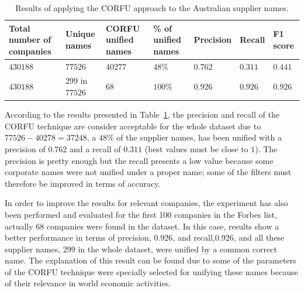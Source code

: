 \documentclass[1p,12pt]{elsarticle}
\begin{document}
\begin{table}[!h]
	\renewcommand{\arraystretch}{1.3}
	\begin{center}
		\begin{tabular}{|p{2.5cm}|p{2cm}|p{1.5cm}|p{1.8cm}|l|l|l|}
			\hline
			\textbf{Total number of companies} & \textbf{Unique names}& \textbf{CORFU unified names}& \textbf{\% of unified names} & \textbf{Precision} & \textbf{Recall} & \textbf{F1 score} \\  \hline
			$430188$ & $77526$ & $40277$  &$48\%$ & $0.762$ & $0.311$&$0.441$ \\ \hline   
			$430188$ & $299$ in $77526$ & $68$ & $100\%$&  $0.926$ & $0.926$ &$0.926$\\ \hline
			\hline
		\end{tabular}
		\caption{Results of applying the CORFU approach to the Australian supplier names.}
		\label{tabla:aus-results}
	\end{center}
\end{table} 


According to the results presented in Table~\ref{tabla:aus-results}, the precision 
and recall of the CORFU technique are consider acceptable for the whole dataset 
due to $77526-40278=37248$, a $48\%$ of the supplier names, has been unified with 
a precision of $0.762$ and a recall of $0.311$ (best values must be close to $1$). 
The precision is pretty enough but the recall presents a low value because some 
corporate names were not unified under a proper name; some of the filters must therefore 
be improved in terms of accuracy.

In order to improve the results for relevant companies, the experiment has also 
been performed and evaluated for the first 100 companies in the Forbes list, actually $68$ companies were 
found in the dataset. In this case, results show a better performance in terms of precision, $0.926$, and recall,$0.926$, and 
all these supplier names, $299$ in the whole dataset, were unified by a common correct name. 
The explanation of this result can be found due to some of the parameters of the CORFU technique were specially selected for unifying 
these names because of their relevance in world economic activities.
\end{document}
